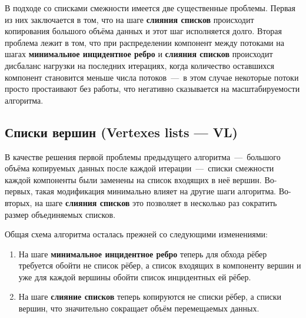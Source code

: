 \documentclass[a4paper,10pt]{extarticle}
\begin{document}
В  подходе со списками смежности имеется две существенные проблемы. 
Первая из них заключается в том, что на шаге \textbf{слияния списков} происходит копирования большого объёма данных и этот шаг исполняется долго.
Вторая проблема лежит в том, что при распределении компонент между потоками на шагах \textbf{минимальное инцидентное ребро} и \textbf{слияния списков} происходит дисбаланс нагрузки на последних итерациях, когда количество оставшихся компонент становится меньше числа потоков~---~в этом случае некоторые потоки просто простаивают без работы, что негативно сказывается на масштабируемости алгоритма.


\subsection{Списки вершин (Vertexes lists --- VL)}
\label{subsec:boruvkaVL}


В качестве решения первой проблемы предыдущего алгоритма~---~большого объёма копируемых данных после каждой итерации~---~списки смежности каждой компоненты были заменены на список входящих в неё вершин. Во-первых, такая модификация минимально влияет на другие шаги алгоритма. Во-вторых, на шаге \textbf{слияния списков} это позволяет в несколько раз сократить размер объединяемых списков.

Общая схема алгоритма осталась прежней со следующими изменениями:
\begin{enumerate}
    \item На шаге \textbf{минимальное инцидентное ребро} теперь для обхода рёбер требуется обойти не список рёбер, а список входящих в компоненту вершин и уже для каждой вершины обойти список инцидентных ей рёбер.
    \item На шаге \textbf{слияние списков} теперь копируются не списки рёбер, а списки вершин, что значительно сокращает объём перемещаемых данных.
\end{enumerate}
\end{document}
